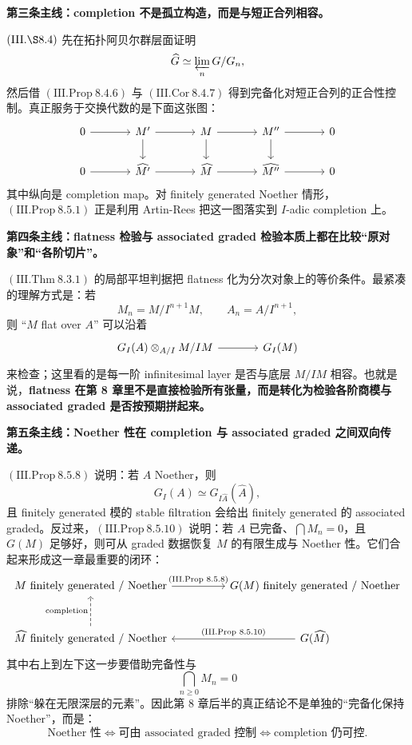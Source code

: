 \documentclass[a4paper]{ctexart}
\theoremstyle{definition}
\theoremstyle{analysis}
\theoremstyle{plain}
\begin{document}
\medskip

\textbf{第三条主线：completion 不是孤立构造，而是与短正合列相容。}

\((\mathrm{III.\S 8.4})\) 先在拓扑阿贝尔群层面证明
\[
  \widehat G \simeq \varprojlim_n G/G_n,
\]
然后借 \((\mathrm{III.Prop}\ 8.4.6)\) 与 \((\mathrm{III.Cor}\ 8.4.7)\) 得到完备化对短正合列的正合性控制。真正服务于交换代数的是下面这张图：
\[
\begin{tikzcd}[column sep=large]
0 \arrow[r] & M' \arrow[r] \arrow[d] & M \arrow[r] \arrow[d] & M'' \arrow[r] \arrow[d] & 0 \\
0 \arrow[r] & \widehat{M'} \arrow[r] & \widehat M \arrow[r] & \widehat{M''} \arrow[r] & 0
\end{tikzcd}
\]
其中纵向是 completion map。对 finitely generated Noether 情形，\((\mathrm{III.Prop}\ 8.5.1)\) 正是利用 Artin-Rees 把这一图落实到 \(I\)-adic completion 上。

\medskip

\textbf{第四条主线：flatness 检验与 associated graded 检验本质上都在比较“原对象”和“各阶切片”。}

\((\mathrm{III.Thm}\ 8.3.1)\) 的局部平坦判据把 flatness 化为分次对象上的等价条件。最紧凑的理解方式是：若
\[
  M_n=M/I^{n+1}M,\qquad A_n=A/I^{n+1},
\]
则 “\(M\) flat over \(A\)” 可以沿着
\[
\begin{tikzcd}[column sep=large]
G_I(A)\otimes_{A/I} M/IM \arrow[r] & G_I(M)
\end{tikzcd}
\]
来检查；这里看的是每一阶 infinitesimal layer 是否与底层 \(M/IM\) 相容。也就是说，\textbf{flatness 在第 8 章里不是直接检验所有张量，而是转化为检验各阶商模与 associated graded 是否按预期拼起来。}

\medskip

\textbf{第五条主线：Noether 性在 completion 与 associated graded 之间双向传递。}

\((\mathrm{III.Prop}\ 8.5.8)\) 说明：若 \(A\) Noether，则
\[
  G_I(A)\simeq G_{I\widehat A}(\widehat A),
\]
且 finitely generated 模的 stable filtration 会给出 finitely generated 的 associated graded。反过来，\((\mathrm{III.Prop}\ 8.5.10)\) 说明：若 \(A\) 已完备、\(\bigcap M_n=0\)，且 \(G(M)\) 足够好，则可从 graded 数据恢复 \(M\) 的有限生成与 Noether 性。它们合起来形成这一章最重要的闭环：
\[
\begin{tikzcd}[column sep=huge, row sep=large]
M \text{ finitely generated / Noether} \arrow[r, "\text{(III.Prop 8.5.8)}"] & G(M)\text{ finitely generated / Noether} \\
\widehat M \text{ finitely generated / Noether} \arrow[u, dashed, "\text{completion}"] & G(\widehat M)\arrow[l, "\text{(III.Prop 8.5.10)}"']
\end{tikzcd}
\]
其中右上到左下这一步要借助完备性与
\[
  \bigcap_{n\ge 0} M_n=0
\]
排除“躲在无限深层的元素”。因此第 8 章后半的真正结论不是单独的“完备化保持 Noether”，而是：
\[
  \text{Noether 性}
  \Longleftrightarrow
  \text{可由 associated graded 控制}
  \Longleftrightarrow
  \text{completion 仍可控}.
\]
\end{document}
